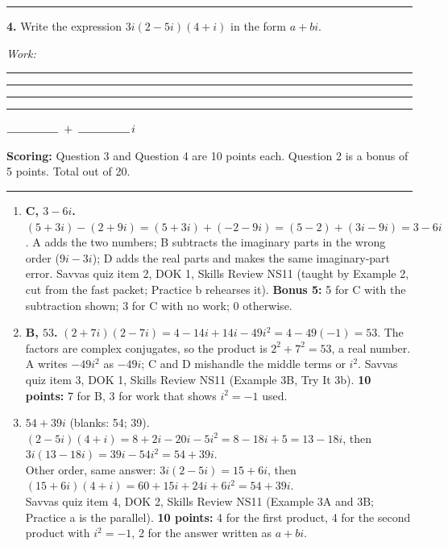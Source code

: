 \documentclass[11pt]{article}
\begin{document}
\vspace{10pt}\noindent\rule{\textwidth}{0.4pt}

\vspace{6pt}
\textbf{4.} Write the expression $3i(2-5i)(4+i)$ in the form $a+bi$.

\vspace{6pt}
\textit{Work:}

\vspace{26pt}\rule{\linewidth}{0.4pt}

\vspace{20pt}\rule{\linewidth}{0.4pt}

\vspace{20pt}\rule{\linewidth}{0.4pt}

\vspace{20pt}\rule{\linewidth}{0.4pt}

\vspace{14pt}
\hfill $\rule{1.6cm}{0.4pt}\;+\;\rule{1.6cm}{0.4pt}\,i$

\vfill
\noindent\textbf{Scoring:} Question 3 and Question 4 are 10 points each. Question 2 is a bonus of 5 points. Total out of 20.

\newpage
{}

\vspace{4pt}\noindent\rule{\textwidth}{0.6pt}

\begin{enumerate}
\item[2.] \textbf{C, $3-6i$.} \mbox{$(5+3i)-(2+9i)=(5+3i)+(-2-9i)=(5-2)+(3i-9i)=3-6i$}. A adds the two numbers; B subtracts the imaginary parts in the wrong order ($9i-3i$); D adds the real parts and makes the same imaginary-part error. Savvas quiz item 2, DOK 1, Skills Review NS11 (taught by Example 2, cut from the fast packet; Practice b rehearses it). \textbf{Bonus 5:} 5 for C with the subtraction shown; 3 for C with no work; 0 otherwise.
\item[3.] \textbf{B, $53$.} \mbox{$(2+7i)(2-7i)=4-14i+14i-49i^2=4-49(-1)=53$}. The factors are complex conjugates, so the product is $2^2+7^2=53$, a real number. A writes $-49i^2$ as $-49i$; C and D mishandle the middle terms or $i^2$. Savvas quiz item 3, DOK 1, Skills Review NS11 (Example 3B, Try It 3b). \textbf{10 points:} 7 for B, 3 for work that shows $i^2=-1$ used.
\item[4.] \textbf{$54+39i$} (blanks: 54; 39).\\
$(2-5i)(4+i)=8+2i-20i-5i^2=8-18i+5=13-18i$, then $3i(13-18i)=39i-54i^2=54+39i$.\\
Other order, same answer: $3i(2-5i)=15+6i$, then $(15+6i)(4+i)=60+15i+24i+6i^2=54+39i$.\\
Savvas quiz item 4, DOK 2, Skills Review NS11 (Example 3A and 3B; Practice a is the parallel). \textbf{10 points:} 4 for the first product, 4 for the second product with $i^2=-1$, 2 for the answer written as $a+bi$.
\end{enumerate}
\end{document}
